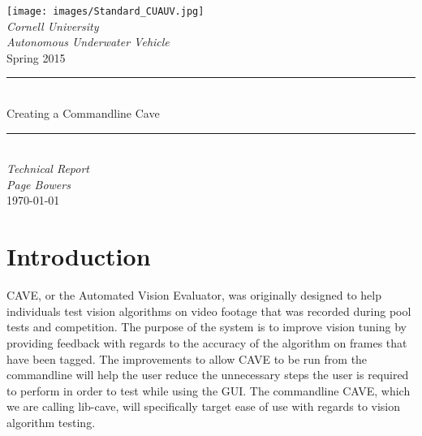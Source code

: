 \begin{titlepage}
\begin{center}
\texttt{[image: images/Standard\_CUAUV.jpg]}\\[0.2cm]
\textsl{\huge Cornell University} \\[0.05cm]
\textsl{\huge Autonomous Underwater Vehicle}\\[0.5cm]
{\huge Spring 2015}\\[0.2cm]
\rule{\linewidth}{0.5mm}\\[0.2cm]
{\Huge Creating a Commandline Cave}
\rule{\linewidth}{0.5mm}\\[0.4cm]


\emph{\huge Technical Report}\\[0.5cm]
\textsl{\large Page Bowers} \\[0.05cm]
\vfill{\today}
\end{center}
\end{titlepage}

\pdfpagewidth 8.5in
\pdfpageheight 11in

\pagestyle{fancy}
\fancyhf{}
\setlength{\headheight}{30pt}
\renewcommand{\headrulewidth}{0.4pt}
\renewcommand{\footrulewidth}{0.4pt}

\cfoot{\thepage}

\tableofcontents
\pagebreak

\part{Introduction} %

CAVE, or the Automated Vision Evaluator, was originally designed to help individuals test vision algorithms on video footage that was recorded during pool tests and competition.  The purpose of the system is to improve vision tuning by providing feedback with regards to the accuracy of the algorithm on frames that have been tagged.  The improvements to allow CAVE to be run from the commandline will help the user reduce the unnecessary steps the user is required to perform in order to test while using the GUI.  The commandline CAVE, which we are calling lib-cave, will specifically target ease of use with regards to vision algorithm testing.



\pagebreak

